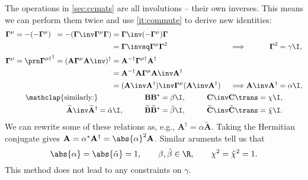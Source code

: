 \documentclass[11pt]{article}
\newcommand{\invd}{^{-\dag}}
\newcommand{\Gammab}{\boldsymbol{\Gamma}}
\newcommand{\mud}{{\mu\dag}}
\newcommand{\A}{\mathbf{A}}
\newcommand{\B}{\mathbf{B}}
\renewcommand{\C}{\mathbf{C}}
\newcommand{\At}{\widetilde{\A}}
\newcommand{\Bt}{\widetilde{\B}}
\newcommand{\Ct}{\widetilde{\C}}
\newcommand{\alphat}{\tilde{\alpha}}
\newcommand{\betat}{\tilde{\beta}}
\newcommand{\chit}{\tilde{\chi}}
\begin{document}
The operations in \cref{sec:ccmats} are all involutions -- their own inverses.
This means we can perform them twice and use \cref{it:commute} to derive new identities:
%
\begin{equation*}
\begin{gathered}
\begin{alignedat}{5}
  \Gammab^\mu &= -(-\Gammab^\mu) &
        &= -(\Gammab\inv \Gammab^\mu \Gammab) &
        &= \Gammab\inv (-\Gammab^\mu) \Gammab \\ && &&
        &= \Gammab\invsq \Gammab^\mu \Gammab^2 &\quad
  &\implies &
  \Gammab^2 &= \gamma \I, \\
  \Gammab^\mu &= \Gammap[\mud]^\dag &
        &= (\A \Gammab^\mu \A\inv)^\dag &
        &= \A\invd \Gammab^\mud \A^\dag \\ && &&
        &= \A\invd \A \Gammab^\mu \A\inv \A^\dag \\ && &&
        &= (\A\inv \A^\dag)\inv \Gammab^\mu (\A\inv \A^\dag) &
  &\implies &
  \A\inv \A^\dag &= \alpha \I,
\end{alignedat} \\
\begin{aligned}
  \mathclap{\text{similarly:}} &&\qquad
  \B \B^\ast &= \beta \I, &\qquad
  \C\inv \C\trans &= \chi \I, \\
  \At\inv \At^\dag &= \alphat \I, &
  \Bt \Bt^\ast &= \betat \I, &
  \Ct\inv \Ct\trans &= \chit \I.
\end{aligned}
\end{gathered}
\end{equation*}
%
We can rewrite some of these relations as, e.g., \(\A^\dag = \alpha \At\).
Taking the Hermitian conjugate gives \(\A = \alpha^\ast \A^\dag = \abs{\alpha}^2 \A\).
Similar aruments tell us that
%
\begin{equation}\label{eq:constinvol}
  \abs{\alpha} = \abs{\alphat} = 1, \qquad
  \beta, \betat \in \R, \qquad
  \chi^2 = \chit^2 = 1.
\end{equation}
%
This method does not lead to any constraints on \(\gamma\).
\end{document}
